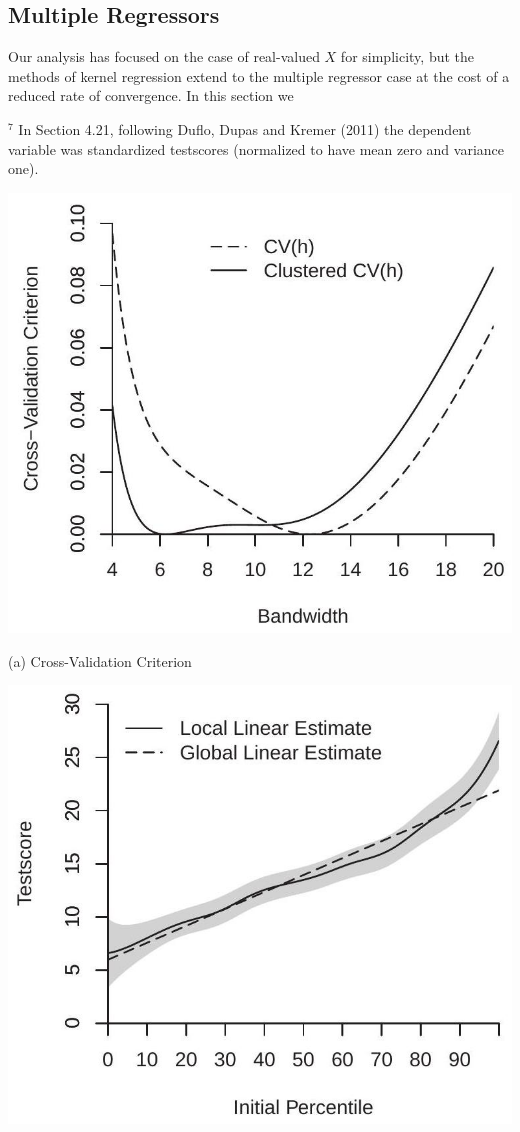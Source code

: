\documentclass[10pt]{article}
\begin{document}
\subsection{Multiple Regressors}
Our analysis has focused on the case of real-valued $X$ for simplicity, but the methods of kernel regression extend to the multiple regressor case at the cost of a reduced rate of convergence. In this section we

${ }^{7}$ In Section 4.21, following Duflo, Dupas and Kremer (2011) the dependent variable was standardized testscores (normalized to have mean zero and variance one).

\includegraphics[max width=\textwidth]{2022_10_23_027876b875523fa3ea56g-26}

(a) Cross-Validation Criterion

\includegraphics[max width=\textwidth]{2022_10_23_027876b875523fa3ea56g-26(1)}
\end{document}
